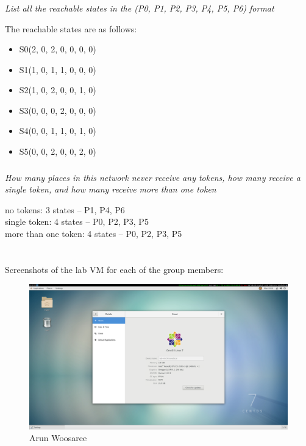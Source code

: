 \documentclass[letterpaper]{article}
\begin{document}
\subsubsection{}
\textit{List all the reachable states in the (P0, P1, P2, P3, P4, P5, P6) format}

The reachable states are as follows:
\begin{itemize}
 \item S0(2, 0, 2, 0, 0, 0, 0)
 \item S1(1, 0, 1, 1, 0, 0, 0)
 \item S2(1, 0, 2, 0, 0, 1, 0)
 \item S3(0, 0, 0, 2, 0, 0, 0)
 \item S4(0, 0, 1, 1, 0, 1, 0)
 \item S5(0, 0, 2, 0, 0, 2, 0)
\end{itemize}

\subsubsection{}
\textit{How many places in this network never receive any tokens, how many receive a single token, and how many receive more than one token}

no tokens: 3 states -- P1, P4, P6\\
single token: 4 states -- P0, P2, P3, P5\\
more than one token: 4 states -- P0, P2, P3, P5\\


\section{}

Screenshots of the lab VM for each of the group members:

\begin{figure}[H]
 \centering
 \includegraphics[width=\textwidth]{arun.png}
 \caption{Arun Woosaree}
\end{figure}
\end{document}
